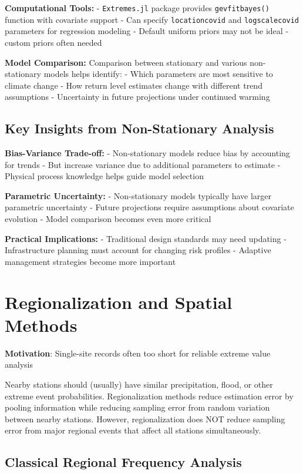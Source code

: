 \documentclass[
  letterpaper,
  DIV=11,
  numbers=noendperiod]{scrreprt}
\begin{document}
\textbf{Computational Tools:} - \texttt{Extremes.jl} package provides
\texttt{gevfitbayes()} function with covariate support - Can specify
\texttt{locationcovid} and \texttt{logscalecovid} parameters for
regression modeling - Default uniform priors may not be ideal - custom
priors often needed

\textbf{Model Comparison:} Comparison between stationary and various
non-stationary models helps identify: - Which parameters are most
sensitive to climate change - How return level estimates change with
different trend assumptions - Uncertainty in future projections under
continued warming

\subsection{Key Insights from Non-Stationary
Analysis}\label{key-insights-from-non-stationary-analysis}

\textbf{Bias-Variance Trade-off:} - Non-stationary models reduce bias by
accounting for trends - But increase variance due to additional
parameters to estimate - Physical process knowledge helps guide model
selection

\textbf{Parametric Uncertainty:} - Non-stationary models typically have
larger parametric uncertainty - Future projections require assumptions
about covariate evolution - Model comparison becomes even more critical

\textbf{Practical Implications:} - Traditional design standards may need
updating - Infrastructure planning must account for changing risk
profiles - Adaptive management strategies become more important

\section{Regionalization and Spatial
Methods}\label{regionalization-and-spatial-methods}

\textbf{Motivation}: Single-site records often too short for reliable
extreme value analysis

Nearby stations should (usually) have similar precipitation, flood, or
other extreme event probabilities. Regionalization methods reduce
estimation error by pooling information while reducing sampling error
from random variation between nearby stations. However, regionalization
does NOT reduce sampling error from major regional events that affect
all stations simultaneously.

\subsection{Classical Regional Frequency
Analysis}\label{classical-regional-frequency-analysis}
\end{document}
